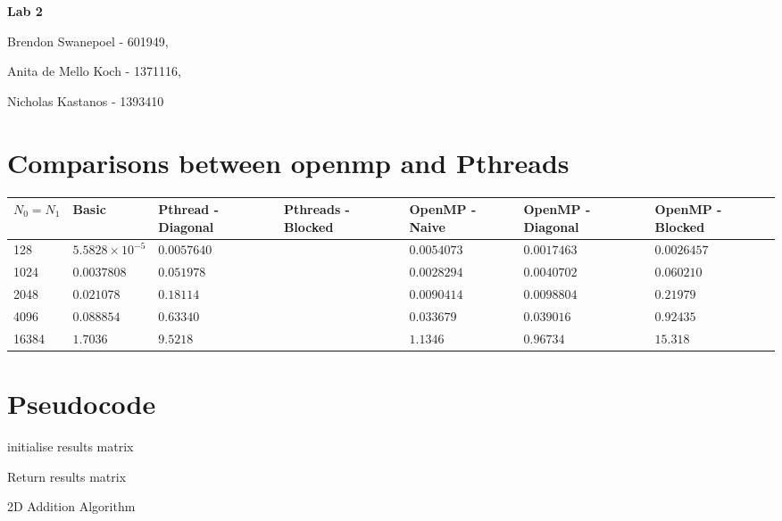\documentclass[a4paper,10pt]{article}
\begin{document}
{\LARGE{\centerline{\bf Lab 2}}}
{\Large{\centerline{Brendon Swanepoel - 601949,}
\centerline{ Anita de Mello Koch - 1371116,} 
\centerline{Nicholas Kastanos - 1393410}}}

\section{Comparisons between openmp and Pthreads}

\begin{center}
\begin{tabular}{| p{2cm} | p{2cm} | p{2cm} | p{2cm} | p{2cm} | p{2cm} | p{2cm} |}
\hline
 $N_{0}=N_{1}$  & Basic & Pthread -  Diagonal & Pthreads - Blocked&OpenMP - Naive& OpenMP - Diagonal & OpenMP - Blocked\\ \hline
 128 & $5.5828\times10^{-5}$ & $0.0057640$ &&$0.0054073$&$0.0017463$&$0.0026457$\\  
 1024 & $0.0037808$ & $0.051978$ &&$0.0028294$&$0.0040702$&$0.060210$\\
 2048& $0.021078$ & $0.18114$ &&$0.0090414$&$0.0098804$&$0.21979$\\
 4096 & $0.088854$ & $0.63340$ &&$0.033679$&$0.039016$&$0.92435$\\
 16384 & $1.7036$ & $9.5218$ &&$1.1346$&$0.96734$&$15.318$\\
 \hline    
\end{tabular}
\end{center}

\section{Pseudocode}

\begin{algorithm}[H]
	\SetAlgoLined
	initialise results matrix\; 

	Return results matrix\;
\caption{2D Addition Algorithm}
\end{algorithm}
\end{document}
